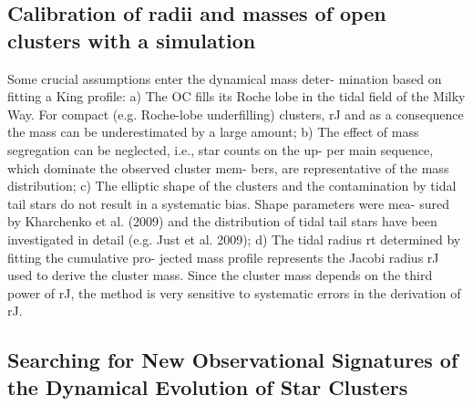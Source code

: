 \documentclass[../Main.tex]{subfiles}
\begin{document}
{\subsection{Calibration of radii and masses of open clusters with a simulation}


Some crucial assumptions enter the dynamical mass deter-
mination based on fitting a King profile: a) The OC fills its
Roche lobe in the tidal field of the Milky Way. For compact (e.g.
Roche-lobe underfilling) clusters, rJ and as a consequence the
mass can be underestimated by a large amount; b) The eﬀect of
mass segregation can be neglected, i.e., star counts on the up-
per main sequence, which dominate the observed cluster mem-
bers, are representative of the mass distribution; c) The elliptic
shape of the clusters and the contamination by tidal tail stars
do not result in a systematic bias. Shape parameters were mea-
sured by Kharchenko et al. (2009) and the distribution of tidal
tail stars have been investigated in detail (e.g. Just et al. 2009);
d) The tidal radius rt determined by fitting the cumulative pro-
jected mass profile represents the Jacobi radius rJ used to derive
the cluster mass. Since the cluster mass depends on the third
power of rJ, the method is very sensitive to systematic errors in
the derivation of rJ.

\subsection{Searching for New Observational Signatures of the Dynamical Evolution of Star Clusters}


}
\end{document}
